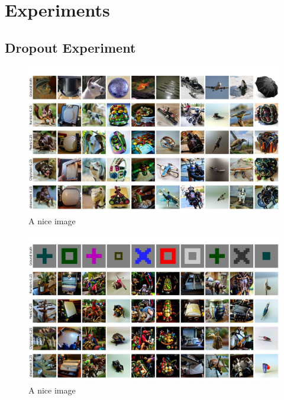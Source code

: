 \chapter{Experiments}
\section{Dropout Experiment}

\begin{figure}[ht]
   \centering
   \includegraphics[width=1\textwidth]{plots/dropout_qual_eval_bd_test.JPEG}
   \caption{A nice image}\label{fig:dropout_qual_eval_bd_test}
\end{figure}

\begin{figure}[ht]
   \centering
   \includegraphics[width=1\textwidth]{plots/dropout_qual_eval_bd_art.JPEG}
   \caption{A nice image}\label{fig:dropout_qual_eval_bd_art}
\end{figure}


